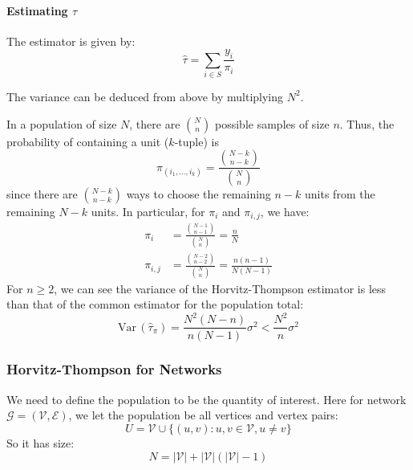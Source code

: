 \documentclass{article}
\begin{document}
\paragraph{Estimating $\tau$} The estimator is given by:
\begin{equation*}
    \hat{\tau} = \sum_{i\in S} \frac{y_i}{\pi_i}
\end{equation*}

The variance can be deduced from above by multiplying $N^2$.

\begin{example}\label{ex:srs}
    In a population of size $N$, there are $\binom{N}{n}$ possible samples of size $n$. Thus, the probability of containing a unit ($k$-tuple) is 
    \begin{equation*}
        \pi_{(i_1, \ldots, i_k)} = \frac{\binom{N-k}{n-k}}{\binom{N}{n}}
    \end{equation*}
    since there are $\binom{N-k}{n-k}$ ways to choose the remaining $n-k$ units from the remaining $N-k$ units.  
    In particular, for $\pi_i$ and $\pi_{i,j}$, we have:
    \begin{align*}
        \pi_i &= \frac{\binom{N-1}{n-1}}{\binom{N}{n}} = \frac{n}{N}\\
        \pi_{i,j} &= \frac{\binom{N-2}{n-2}}{\binom{N}{n}} = \frac{n(n-1)}{N(N-1)}
    \end{align*}
    For $n\geq 2$, we can see the variance of the Horvitz-Thompson estimator is less than that of the common estimator for the population total:
    \begin{equation*}
        \mathrm{Var}\,(\hat{\tau}_{\pi})=\frac{N^{2}(N-n)}{n(N-1)}\sigma^{2}<\frac{N^{2}}{n}\sigma^{2}
    \end{equation*}
\end{example}

\subsubsection{Horvitz-Thompson for Networks}

We need to define the population to be the quantity of interest. Here for network ${\mathcal{G}}=(\mathcal{V},{\mathcal{E}})$, we let the population be all vertices and vertex pairs:
\begin{equation*}
    U=\mathcal{V}\cup \{(u,v):u,v\in \mathcal{V}, u\neq v\}
\end{equation*}
So it has size:
\begin{equation*}
    N=|\mathcal{V}|+|\mathcal{V}|(|\mathcal{V}|-1)
\end{equation*}
\end{document}
